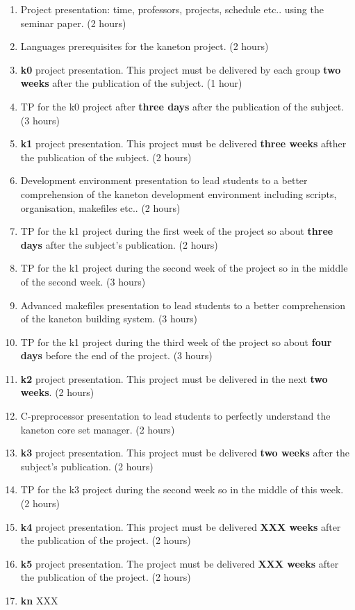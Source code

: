 \begin{multicols}{2}
\begin{enumerate}
  \item
    Project presentation: time, professors, projects,
    schedule etc.. using the seminar paper. (2 hours)
  \item
    Languages prerequisites for the kaneton project. (2 hours)
  \item
    \textbf{k0} project presentation. This project must be delivered by
    each group \textbf{two weeks} after the publication of the
    subject. (1 hour)
  \item
    TP for the k0 project after \textbf{three days} after the publication of
    the subject. (3 hours)
  \item
    \textbf{k1} project presentation. This project must be delivered
    \textbf{three weeks} afther the publication of the subject. (2 hours)
  \item
    Development environment presentation to lead students to a better
    comprehension of the kaneton development environment including scripts,
    organisation, makefiles etc.. (2 hours)
  \item
    TP for the k1 project during the first week of the project so about
    \textbf{three days} after the subject's publication. (2 hours)
  \item
    TP for the k1 project during the second week of the project so in the
    middle of the second week. (3 hours)
  \item
    Advanced makefiles presentation to lead students to a better
    comprehension of the kaneton building system. (3 hours)
  \item
    TP for the k1 project during the third week of the project so about
    \textbf{four days} before the end of the project. (3 hours)
  \item
    \textbf{k2} project presentation. This project must be delivered
    in the next \textbf{two weeks}. (2 hours)
  \item
    C-preprocessor presentation to lead students to perfectly understand
    the kaneton core set manager. (2 hours)
  \item
    \textbf{k3} project presentation. This project must be delivered
    \textbf{two weeks} after the subject's publication. (2 hours)
  \item
    TP for the k3 project during the second week so in the middle of this
    week. (2 hours)
  \item
    \textbf{k4} project presentation. This project must be delivered
    \textbf{XXX weeks} after the publication of the project. (2 hours)
  \item
    \textbf{k5} project presentation. The project must be delivered
    \textbf{XXX weeks} after the publication of the project. (2 hours)
  \item
    \textbf{kn} XXX
\end{enumerate}


\end{multicols}
